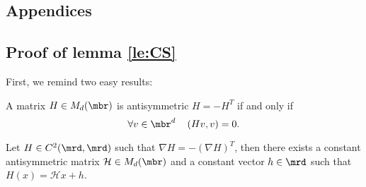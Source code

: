 \begin{subappendices}
\renewcommand{\thesection}{\Alph{section}}
\section{Appendices}
\subsection{Proof of lemma \ref{le:CS}} %
	\label{sec:proof_of_lemma_CS}
First, we remind two easy results:
\begin{lemma}\label{le:antisym}
	A matrix $H\in M_d(\mbr)$ is antisymmetric $H=-H^T$ if and only if \[\forall  v \in \mbr^d \quad \left( Hv,v \right)=0.\]
\end{lemma}%
\begin{lemma}\label{le:antisym2}Let $H\in C^2(\mrd, \mrd)$ such that $\nabla H=-(\nabla H)^T$, then there exists a constant antisymmetric matrix $\mathcal H\in M_d(\mbr)$ and a constant vector $h\in \mrd$ such that $H(x)=\mathcal Hx+h$.
\end{lemma}


\end{subappendices}
